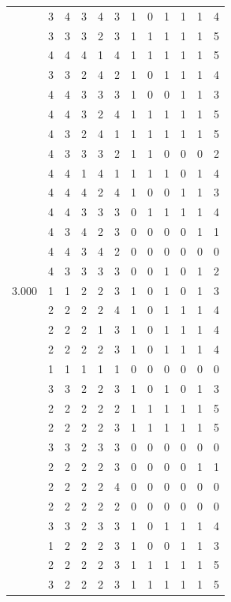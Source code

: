 \documentclass[]{book}
\theoremstyle{definition}
\theoremstyle{definition}
\theoremstyle{definition}
\theoremstyle{remark}
\begin{document}
\begin{table}
{\begin{tabular}[t]{rrrrrrrrrrrr}
 & 3 & 4 & 3 & 4 & 3 & 1 & 0 & 1 & 1 & 1 & 4\\
 & 3 & 3 & 3 & 2 & 3 & 1 & 1 & 1 & 1 & 1 & 5\\
 & 4 & 4 & 4 & 1 & 4 & 1 & 1 & 1 & 1 & 1 & 5\\
 & 3 & 3 & 2 & 4 & 2 & 1 & 0 & 1 & 1 & 1 & 4\\
 & 4 & 4 & 3 & 3 & 3 & 1 & 0 & 0 & 1 & 1 & 3\\
 & 4 & 4 & 3 & 2 & 4 & 1 & 1 & 1 & 1 & 1 & 5\\
 & 4 & 3 & 2 & 4 & 1 & 1 & 1 & 1 & 1 & 1 & 5\\
 & 4 & 3 & 3 & 3 & 2 & 1 & 1 & 0 & 0 & 0 & 2\\
 & 4 & 4 & 1 & 4 & 1 & 1 & 1 & 1 & 0 & 1 & 4\\
 & 4 & 4 & 4 & 2 & 4 & 1 & 0 & 0 & 1 & 1 & 3\\
 & 4 & 4 & 3 & 3 & 3 & 0 & 1 & 1 & 1 & 1 & 4\\
 & 4 & 3 & 4 & 2 & 3 & 0 & 0 & 0 & 0 & 1 & 1\\
 & 4 & 4 & 3 & 4 & 2 & 0 & 0 & 0 & 0 & 0 & 0\\
 & 4 & 3 & 3 & 3 & 3 & 0 & 0 & 1 & 0 & 1 & 2\\
3.000 & 1 & 1 & 2 & 2 & 3 & 1 & 0 & 1 & 0 & 1 & 3\\
 & 2 & 2 & 2 & 2 & 4 & 1 & 0 & 1 & 1 & 1 & 4\\
 & 2 & 2 & 2 & 1 & 3 & 1 & 0 & 1 & 1 & 1 & 4\\
 & 2 & 2 & 2 & 2 & 3 & 1 & 0 & 1 & 1 & 1 & 4\\
 & 1 & 1 & 1 & 1 & 1 & 0 & 0 & 0 & 0 & 0 & 0\\
 & 3 & 3 & 2 & 2 & 3 & 1 & 0 & 1 & 0 & 1 & 3\\
 & 2 & 2 & 2 & 2 & 2 & 1 & 1 & 1 & 1 & 1 & 5\\
 & 2 & 2 & 2 & 2 & 3 & 1 & 1 & 1 & 1 & 1 & 5\\
 & 3 & 3 & 2 & 3 & 3 & 0 & 0 & 0 & 0 & 0 & 0\\
 & 2 & 2 & 2 & 2 & 3 & 0 & 0 & 0 & 0 & 1 & 1\\
 & 2 & 2 & 2 & 2 & 4 & 0 & 0 & 0 & 0 & 0 & 0\\
 & 2 & 2 & 2 & 2 & 2 & 0 & 0 & 0 & 0 & 0 & 0\\
 & 3 & 3 & 2 & 3 & 3 & 1 & 0 & 1 & 1 & 1 & 4\\
 & 1 & 2 & 2 & 2 & 3 & 1 & 0 & 0 & 1 & 1 & 3\\
 & 2 & 2 & 2 & 2 & 3 & 1 & 1 & 1 & 1 & 1 & 5\\
 & 3 & 2 & 2 & 2 & 3 & 1 & 1 & 1 & 1 & 1 & 5\\

\end{tabular}}
\end{table}
\end{document}
